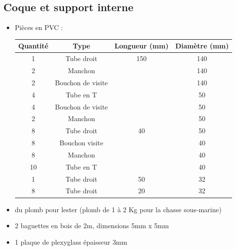 \documentclass[11pt,a4paper]{article}
\begin{document}
    \subsection{Coque et support interne}
      \begin{itemize}
      \setlength\itemsep{-2mm}
       \item Pièces en PVC :
              \begin{center}
                \begin{tabular}{|c|c|c|c|}
                  \hline
                  \textbf{Quantité} & \textbf{Type} & \textbf{Longueur (mm)} & \textbf{Diamètre (mm)}\\
                  \hline
                  1 & Tube droit & 150 & 140\\
                  \hline
                  2 & Manchon & & 140\\
                  \hline
                  2 & Bouchon de visite & & 140\\
                  \hline
                  4 & Tube en T & & 50\\
                  \hline
                  4 & Bouchon de visite & & 50\\
                  \hline
                  2 & Manchon & & 50\\
                  \hline
                  8 & Tube droit & 40 & 50\\
                  \hline
                  8 & Bouchon visite & & 40\\
                  \hline
                  8 & Manchon & & 40\\
                  \hline
                  10 & Tube en T & & 40\\
                  \hline
                  1 & Tube droit & 50 & 32\\
                  \hline
                  8 & Tube droit & 20 & 32\\
                  \hline
                \end{tabular}
              \end{center}
        \item du plomb pour lester (plomb de 1 à 2 Kg pour la chasse sous-marine)
        \item 2 baguettes en bois de 2m, dimensions 5mm x 5mm
        \item 1 plaque de plexyglass épaisseur 3mm
      \end{itemize}

      
\end{document}
